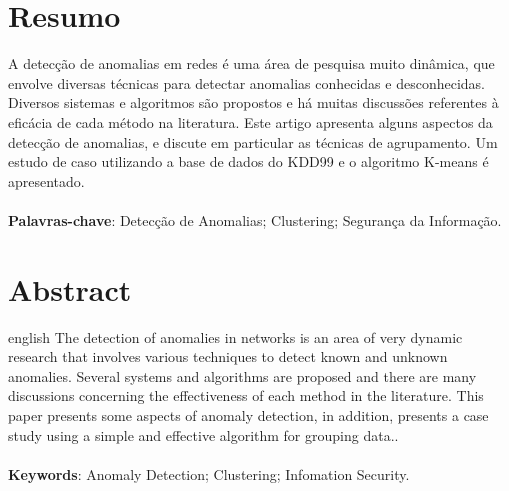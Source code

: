 \documentclass[article,12pt,oneside,a4paper,english,brazil]{unifil}
\date{}
\begin{document}
\frenchspacing
\maketitle
\normalsize

\fontsize{10}{1}\selectfont
\section*{Resumo}
A detecção de anomalias em redes é uma área de pesquisa muito dinâmica, que envolve diversas técnicas para detectar anomalias conhecidas e desconhecidas. Diversos sistemas e algoritmos são propostos e há muitas discussões referentes à eficácia de cada método na literatura. Este artigo apresenta alguns aspectos da detecção de anomalias, e discute em particular as técnicas de agrupamento. Um estudo de caso utilizando a base de dados do KDD99 e o algoritmo K-means é apresentado.\\
\vspace{\onelineskip} \\
\noindent
\textbf{Palavras-chave}: Detecção de Anomalias; Clustering; Segurança da Informação.



\section*{Abstract}
\begin{otherlanguage*}{english}
The detection of anomalies in networks is an area of very dynamic research that involves various techniques to detect known and unknown anomalies. Several systems and algorithms are proposed and there are many discussions concerning the effectiveness of each method in the literature. This paper presents some aspects of anomaly detection, in addition, presents a case study using a simple and effective algorithm for grouping data..\\
\vspace{\onelineskip}\\
\noindent
\textbf{Keywords}: Anomaly Detection; Clustering; Infomation Security.
\end{otherlanguage*}
\end{document}
